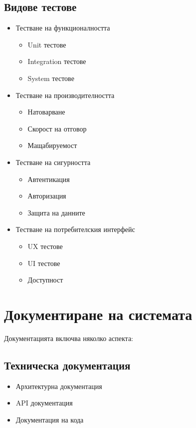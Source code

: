 \documentclass[12pt,a4paper]{article}
\begin{document}
\subsection{Видове тестове}
\begin{itemize}
    \item Тестване на функционалността
    \begin{itemize}
        \item Unit тестове
        \item Integration тестове
        \item System тестове
    \end{itemize}
    
    \item Тестване на производителността
    \begin{itemize}
        \item Натоварване
        \item Скорост на отговор
        \item Мащабируемост
    \end{itemize}
    
    \item Тестване на сигурността
    \begin{itemize}
        \item Автентикация
        \item Авторизация
        \item Защита на данните
    \end{itemize}
    
    \item Тестване на потребителския интерфейс
    \begin{itemize}
        \item UX тестове
        \item UI тестове
        \item Доступност
    \end{itemize}
\end{itemize}

\section{Документиране на системата}
Документацията включва няколко аспекта:

\subsection{Техническа документация}
\begin{itemize}
    \item Архитектурна документация
    \item API документация
    \item Документация на кода
\end{itemize}
\end{document}
